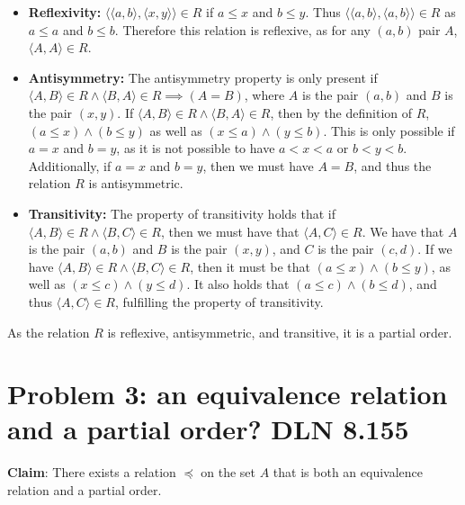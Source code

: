 \documentclass[titlepage]{article}
\begin{document}
\begin{itemize}
\item \textbf{Reflexivity:} $\langle \langle a,b \rangle , \langle x,y \rangle \rangle \in R$ if $a \leq x$ and $b \leq y$. Thus $\langle \langle a,b \rangle , \langle a,b \rangle \rangle \in R$ as $a \leq a$ and $b \leq b$. Therefore this relation is reflexive, as for any $(a,b)$ pair $A$, $\langle A,A \rangle \in R$.
\item \textbf{Antisymmetry:} The antisymmetry property is only present if $\langle A,B \rangle \in R \land \langle B,A \rangle \in R \implies (A=B)$, where $A$ is the pair $(a,b)$ and $B$ is the pair $(x,y)$. If $\langle A,B \rangle \in R \land \langle B,A \rangle \in R$, then by the definition of $R$, $(a \leq x) \land (b \leq y)$ as well as $(x \leq a) \land (y \leq b)$. This is only possible if $a=x$ and $b=y$, as it is not possible to have $a < x < a$ or $b < y < b$. Additionally, if $a=x$ and $b=y$, then we must have $A=B$, and thus the relation $R$ is antisymmetric. 
\item \textbf{Transitivity:} The property of transitivity holds that if $\langle A,B \rangle \in R \land \langle B,C \rangle \in R$, then we must have that $\langle A,C \rangle \in R$. We have that $A$ is the pair $(a,b)$ and $B$ is the pair $(x,y)$, and $C$ is the pair $(c,d)$. If we have $\langle A,B \rangle \in R \land \langle B,C \rangle \in R$, then it must be that $(a \leq x) \land (b \leq y)$, as well as $(x \leq c) \land (y \leq d)$. It also holds that $(a \leq c) \land (b \leq d)$, and thus $\langle A,C \rangle \in R$, fulfilling the property of transitivity.
\end{itemize}

As the relation $R$ is reflexive, antisymmetric, and transitive, it is a partial order. 

\section{Problem 3: an equivalence relation and a partial order? DLN 8.155}

\textbf{Claim}: There exists a relation $\preceq$ on the set $A$ that is both an equivalence relation and a partial order.
\end{document}
